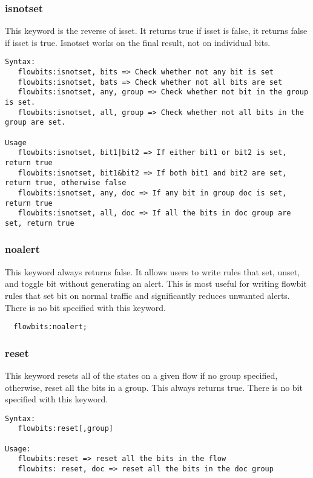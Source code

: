 \documentclass[english]{report}
\begin{document}
\subsubsection{isnotset}
This keyword is the reverse of isset.  It returns true if isset is false, it returns
false if isset is true. Isnotset works on the final result, not on individual bits.

\begin{verbatim}
Syntax:  
   flowbits:isnotset, bits => Check whether not any bit is set
   flowbits:isnotset, bats => Check whether not all bits are set
   flowbits:isnotset, any, group => Check whether not bit in the group is set.
   flowbits:isnotset, all, group => Check whether not all bits in the group are set. 
   
Usage
   flowbits:isnotset, bit1|bit2 => If either bit1 or bit2 is set, return true
   flowbits:isnotset, bit1&bit2 => If both bit1 and bit2 are set, return true, otherwise false
   flowbits:isnotset, any, doc => If any bit in group doc is set, return true
   flowbits:isnotset, all, doc => If all the bits in doc group are set, return true 
\end{verbatim}


\subsubsection{noalert}
This keyword always returns false.  It allows users to write rules that set,
unset, and toggle bit without generating an alert.  This is most useful
for writing flowbit rules that set bit on normal traffic and significantly reduces 
unwanted alerts.  There is no bit specified with this keyword.

\begin{verbatim}
  flowbits:noalert;
\end{verbatim}

\subsubsection{reset}

This keyword resets all of the states on a given flow if no group specified, otherwise, 
reset all the bits in a group. This always returns true.  There is no bit specified with
 this keyword.

\begin{verbatim}
Syntax: 
   flowbits:reset[,group]

Usage:  
   flowbits:reset => reset all the bits in the flow
   flowbits: reset, doc => reset all the bits in the doc group
\end{verbatim}
\end{document}
